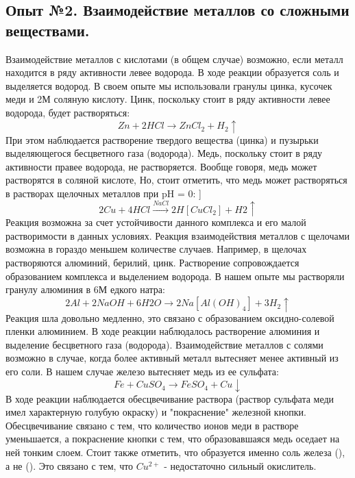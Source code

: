 \documentclass[a4paper, 12pt]{article}
\newcommand{\RomanNumeralCaps}[1]
    {\MakeUppercase{\romannumeral #1}}
\begin{document}
\subsection{Опыт №2. Взаимодействие металлов со сложными веществами.}
Взаимодействие металлов с кислотами (в общем случае) возможно, если металл находится в ряду активности левее водорода. В ходе реакции образуется соль и выделяется водород. В своем опыте мы использовали гранулы цинка, кусочек меди и 2М соляную кислоту. Цинк, поскольку стоит в ряду активности левее водорода, будет растворяться:
\begin{equation}
    Zn + 2HCl \xrightarrow{} ZnCl_2 + H_2\uparrow
\end{equation}
При этом наблюдается растворение твердого вещества (цинка) и пузырьки выделяющегося бесцветного газа (водорода). Медь, поскольку стоит в ряду активности правее водорода, не растворяется. Вообще говоря, медь может растворятся в соляной кислоте, Но, стоит отметить, что медь может растворяться в растворах щелочных металлов при pH = 0:
]
\begin{equation}
    2Cu + 4HCl \xrightarrow{NaCl} 2H[CuCl_2] + H2\uparrow
\end{equation}
Реакция возможна за счет устойчивости данного комплекса и его малой растворимости в данных условиях. \newline
Реакция взаимодействия металлов с щелочами возможна в гораздо меньшем количестве случаев. Например, в щелочах растворяются алюминий, берилий, цинк. Растворение сопровождается образованием комплекса и выделением водорода. В нашем опыте мы растворяли гранулу алюминия в 6М едкого натра:
\begin{equation}
    2Al + 2NaOH + 6H2O \xrightarrow{} 2Na[Al(OH)_4] + 3H_2\uparrow
\end{equation}
Реакция шла довольно медленно, это связано с образованием оксидно-солевой пленки алюминием. В ходе реакции наблюдалось растворение алюминия и выделение бесцветного газа (водорода). \newline
Взаимодействие металлов с солями возможно в случае, когда более активный металл вытесняет менее активный  из его соли. В нашем случае железо вытесняет медь из ее сульфата:
\begin{equation}
    Fe + CuSO_4 \xrightarrow{} FeSO_4 + Cu\downarrow  
\end{equation}
В ходе реакции наблюдается обесцвечивание раствора (раствор сульфата меди имел характерную голубую окраску) и "покраснение" железной кнопки. Обесцвечивание связано с тем, что количество ионов меди в растворе уменьшается, а покраснение кнопки с тем, что образовавшаяся медь оседает на ней тонким слоем. Стоит также отметить, что образуется именно соль железа (\RomanNumeralCaps{2}), а не (\RomanNumeralCaps{3}). Это связано с тем, что $Cu^{2+}$ - недостаточно сильный окислитель.
\end{document}
